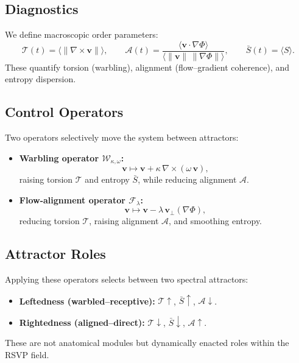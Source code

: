 \documentclass[a4paper,11pt]{article}
\begin{document}
\subsection{Diagnostics}
We define macroscopic order parameters:
\begin{equation}
\mathcal{T}(t) = \big\langle \|\nabla\times \mathbf{v}\|\big\rangle, 
\qquad 
\mathcal{A}(t) = \frac{\langle \mathbf{v}\cdot \nabla \Phi\rangle}{\langle \|\mathbf{v}\|\,\|\nabla \Phi\|\rangle}, 
\qquad 
\bar{S}(t) = \langle S\rangle.
\end{equation}
These quantify torsion (warbling), alignment (flow–gradient coherence), and entropy dispersion.

\subsection{Control Operators}
Two operators selectively move the system between attractors:
\begin{itemize}
    \item \textbf{Warbling operator $\mathcal{W}_{\kappa,\omega}$:}
    \begin{equation}
    \mathbf{v} \mapsto \mathbf{v} + \kappa\,\nabla\times(\omega\,\mathbf{v}),
    \end{equation}
    raising torsion $\mathcal{T}$ and entropy $\bar{S}$, while reducing alignment $\mathcal{A}$.
    \item \textbf{Flow-alignment operator $\mathcal{F}_\lambda$:}
    \begin{equation}
    \mathbf{v} \mapsto \mathbf{v} - \lambda\,\mathbf{v}_\perp(\nabla\Phi),
    \end{equation}
    reducing torsion $\mathcal{T}$, raising alignment $\mathcal{A}$, and smoothing entropy.
\end{itemize}

\subsection{Attractor Roles}
Applying these operators selects between two spectral attractors:
\begin{itemize}
    \item \textbf{Leftedness (warbled–receptive):} $\mathcal{T}\uparrow$, $\bar{S}\uparrow$, $\mathcal{A}\downarrow$.
    \item \textbf{Rightedness (aligned–direct):} $\mathcal{T}\downarrow$, $\bar{S}\downarrow$, $\mathcal{A}\uparrow$.
\end{itemize}
These are not anatomical modules but dynamically enacted roles within the RSVP field.
\end{document}
